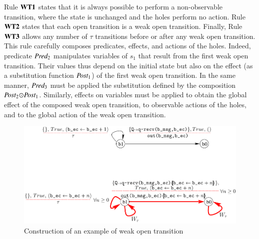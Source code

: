 \documentclass{elsarticle}
\newcommand{\shortodot}{\!\odot\!}
\begin{document}
Rule $\textbf{WT1}$ states that it is always possible to perform a non-observable transition, where the state is unchanged and the holes perform no action. Rule~$\textbf{WT2}$ states that each open transition is a weak open transition. Finally,  Rule~$\textbf{WT3}$ allows any number of $\tau$ transitions before or after any weak open transition. This rule carefully composes predicates, effects, and actions of the holes. Indeed, predicate $\Pred_2$ manipulates variables of $s_1$ that result from the first weak open transition. Their values thus depend on the initial state but also on the effect (as a substitution function $\Post_1$) of the first weak open transition. In the same manner, $\Pred_3$ must be applied the substitution defined by the composition $\Post_2\shortodot\Post_1$. Similarly, effects on variables must be applied to obtain the global effect of the composed weak open transition, to observable actions of the holes, and to the global action of the weak open transition.



\begin{figure}[ht]
   \centerline{\includegraphics[width=\linewidth]{XFIG/WOT2-result}}
  \caption{Construction of an example of weak open transition}
   \label{WOT2}
\end{figure}
\end{document}
